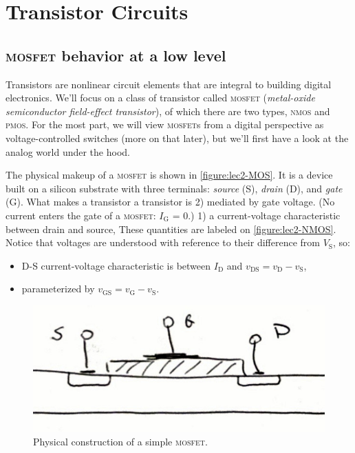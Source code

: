 \chapter{Transistor Circuits}
\section{\textsc{mosfet} behavior at a low level}
Transistors are nonlinear circuit elements that are integral to building digital electronics.
We'll focus on a class of transistor called \textsc{mosfet}
(\emph{metal-oxide semiconductor field-effect transistor}),
of which there are two types, \textsc{nmos} and \textsc{pmos}.
For the most part, we will view \textsc{mosfet}s from a digital perspective as voltage-controlled switches (more on that later), but we'll first have a look at the analog
world under the hood.

The physical makeup of a \textsc{mosfet} is shown in \autoref{figure:lec2-MOS}.
It is a device built on a silicon substrate with three terminals:
\emph{source} (S), \emph{drain} (D), and \emph{gate} (G).
What makes a transistor a transistor is
2) mediated by gate voltage. (No current enters the gate of a \textsc{mosfet}: \(I_\text{G}\) = 0.)
1) a current-voltage characteristic between drain and source,
These quantities are labeled on \autoref{figure:lec2-NMOS}.
Notice that voltages are understood with reference to their difference from \(V_\text{S}\), so:
\begin{itemize}
  \item D-S current-voltage characteristic is between \(I_\text{D}\) and \(v_\text{DS} = v_\text{D} - v_\text{S}\),%
  \item parameterized by \(v_\text{GS} = v_\text{G} - v_\text{S}\).
\end{itemize}

\begin{figure}
  \centering
  \includegraphics[width=0.75\linewidth]{figures/MOS-physical-sketch}
  \caption{Physical construction of a simple \textsc{mosfet}.}
  \label{figure:lec2-MOS}
\end{figure}


